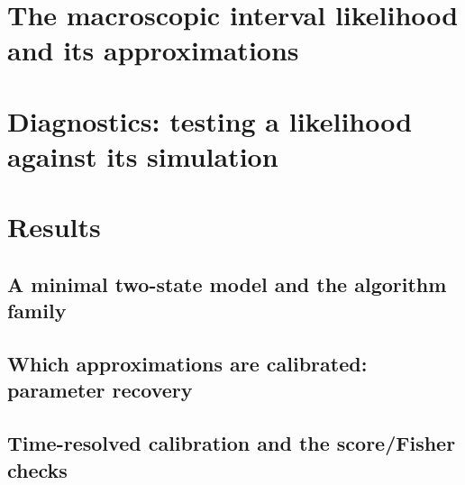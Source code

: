 \documentclass[9pt]{elife}
\begin{document}
\section*{The macroscopic interval likelihood and its approximations}

\section*{Diagnostics: testing a likelihood against its simulation}

\section*{Results}

\subsection*{A minimal two-state model and the algorithm family}

\subsection*{Which approximations are calibrated: parameter recovery}

\subsection*{Time-resolved calibration and the score/Fisher checks}
\end{document}
